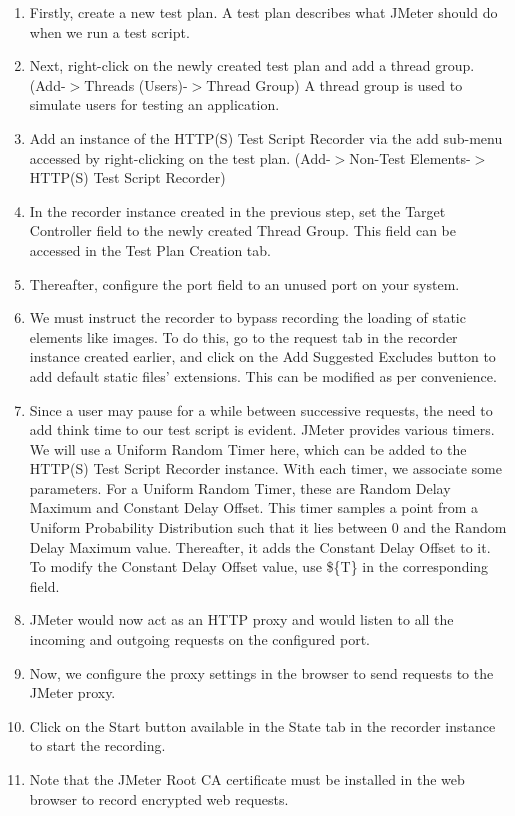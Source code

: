\documentclass[12pt]{article}
\begin{document}
\begin{enumerate}
	\item Firstly, create a new test plan. A test plan describes what JMeter should do when we run a test script. 
	\item Next, right-click on the newly created test plan and add a thread group. (Add-$>$Threads (Users)-$>$Thread Group) A thread group is used to simulate users for testing an application.
	\item Add an instance of the HTTP(S) Test Script Recorder via the add sub-menu accessed by right-clicking on the test plan. (Add-$>$Non-Test Elements-$>$HTTP(S) Test Script Recorder)
	\item In the recorder instance created in the previous step, set the Target Controller field to the newly created Thread Group. This field can be accessed in the Test Plan Creation tab.
	\item Thereafter, configure the port field to an unused port on your system.
	\item We must instruct the recorder to bypass recording the loading of static elements like images. To do this, go to the request tab in the recorder instance created earlier, and click on the Add Suggested Excludes button to add default static files' extensions. This can be modified as per convenience. 
	\item Since a user may pause for a while between successive requests, the need to add think time to our test script is evident. JMeter provides various timers. We will use a Uniform Random Timer here, which can be added to the HTTP(S) Test Script Recorder instance. With each timer, we associate some parameters. For a Uniform Random Timer, these are Random Delay Maximum and Constant Delay Offset. This timer samples a point from a Uniform Probability Distribution such that it lies between 0 and the Random Delay Maximum value. Thereafter, it adds the Constant Delay Offset to it. To modify the Constant Delay Offset value, use \$\{T\} in the corresponding field. 
	\item JMeter would now act as an HTTP proxy and would listen to all the incoming and outgoing requests on the configured port.
	\item Now, we configure the proxy settings in the browser to send requests to the JMeter proxy.
	\item Click on the Start button available in the State tab in the recorder instance to start the recording.
	\item Note that the JMeter Root CA certificate must be installed in the web browser to record encrypted web requests. 

\end{enumerate}
\end{document}
